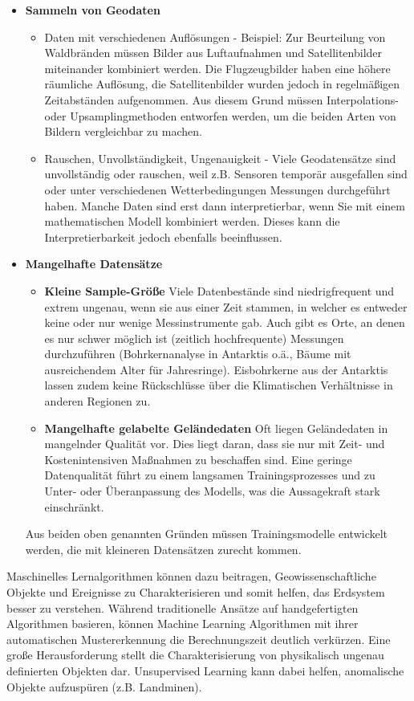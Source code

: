 \documentclass[11pt,ceqn]{book}
\begin{document}
\begin{itemize}
\item \textbf{Sammeln von Geodaten}
\begin{itemize}
\item Daten mit verschiedenen Auflösungen - Beispiel: Zur Beurteilung von Waldbränden müssen Bilder aus Luftaufnahmen und Satellitenbilder miteinander kombiniert werden. Die Flugzeugbilder haben eine höhere räumliche Auflösung, die Satellitenbilder wurden jedoch in regelmäßigen Zeitabständen aufgenommen. Aus diesem Grund müssen Interpolations- oder Upsamplingmethoden entworfen werden, um die beiden Arten von Bildern vergleichbar zu machen.
\item Rauschen, Unvollständigkeit, Ungenauigkeit - Viele Geodatensätze sind unvollständig oder rauschen, weil z.B. Sensoren temporär ausgefallen sind oder unter verschiedenen Wetterbedingungen Messungen durchgeführt haben. Manche Daten sind erst dann interpretierbar, wenn Sie mit einem mathematischen Modell kombiniert werden. Dieses kann die Interpretierbarkeit jedoch ebenfalls beeinflussen.
\end{itemize}

\item \textbf{Mangelhafte Datensätze}
\begin{itemize}
\item \textbf{Kleine Sample-Größe} Viele Datenbestände sind niedrigfrequent und extrem ungenau, wenn sie aus einer Zeit stammen, in welcher es entweder keine oder nur wenige Messinstrumente gab. Auch gibt es Orte, an denen es nur schwer möglich ist (zeitlich hochfrequente) Messungen durchzuführen (Bohrkernanalyse in Antarktis o.ä., Bäume mit ausreichendem Alter für Jahresringe). Eisbohrkerne aus der Antarktis lassen zudem keine Rückschlüsse über die Klimatischen Verhältnisse in anderen Regionen zu. 
\item  \textbf{Mangelhafte gelabelte Geländedaten} Oft liegen Geländedaten in mangelnder Qualität vor. Dies liegt daran, dass sie nur mit Zeit- und Kostenintensiven Maßnahmen zu beschaffen sind. Eine geringe Datenqualität führt zu einem langsamen Trainingsprozesses und zu Unter- oder Überanpassung des Modells, was die Aussagekraft stark einschränkt.
\end{itemize}
Aus beiden oben genannten Gründen müssen Trainingsmodelle entwickelt werden, die mit kleineren Datensätzen zurecht kommen.
\end{itemize}
\bigskip
Maschinelles Lernalgorithmen können dazu beitragen, Geowissenschaftliche Objekte und Ereignisse zu Charakterisieren und somit helfen, das Erdsystem besser zu verstehen. Während traditionelle Ansätze auf handgefertigten Algorithmen basieren, können Machine Learning Algorithmen mit ihrer automatischen Mustererkennung die Berechnungszeit deutlich verkürzen. Eine große Herausforderung stellt die Charakterisierung von physikalisch ungenau definierten Objekten dar. Unsupervised Learning kann dabei helfen, anomalische Objekte aufzuspüren (z.B. Landminen).\\
\end{document}
